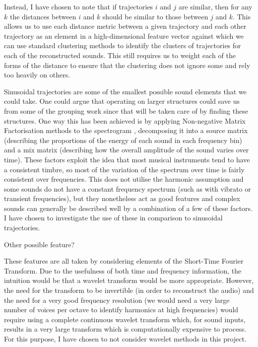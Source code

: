 \documentclass[10pt,twoside,a4paper]{report}
\begin{document}
Instead, I have chosen to note that if trajectories $ i $ and $ j $ are similar, then for any $ k $ the distances between $ i $ and $ k $ should be similar to those between $ j $ and $ k $. This allows us to use each distance metric between a given trajectory and each other trajectory as an element in a high-dimensional feature vector against which we can use standard clustering methods to identify the clusters of trajectories for each of the reconstructed sounds. This still requires us to weight each of the forms of the distance to ensure that the clustering does not ignore some and rely too heavily on others.

Sinusoidal trajectories are some of the smallest possible sound elements that we could take. One could argue that operating on larger structures could save us from some of the grouping work since that will be taken care of by finding these structures. One way this has been achieved is by applying Non-negative Matrix Factorisation methods to the spectrogram \cite{virtanen2003sound}, decomposing it into a source matrix (describing the proportions of the energy of each sound in each frequency bin) and a mix matrix (describing how the overall amplitude of the sound varies over time). These factors exploit the idea that most musical instruments tend to have a consistent timbre, so most of the variation of the spectrum over time is fairly consistent over frequencies. This does not utilise the harmonic assumption and some sounds do not have a constant frequency spectrum (such as with vibrato or transient frequencies), but they nonetheless act as good features and complex sounds can generally be described well by a combination of a few of these factors. I have chosen to investigate the use of these in comparison to sinusoidal trajectories.

Other possible feature?



These features are all taken by considering elements of the Short-Time Fourier Transform. Due to the usefulness of both time and frequency information, the intuition would be that a wavelet transform would be more appropriate. However, the need for the transform to be invertible (in order to reconstruct the audio) and the need for a very good frequency resolution (we would need a very large number of voices per octave to identify harmonics at high frequencies) would require using a complete continuous wavelet transform which, for sound inputs, results in a very large transform which is computationally expensive to process. For this purpose, I have chosen to not consider wavelet methods in this project.
\end{document}
